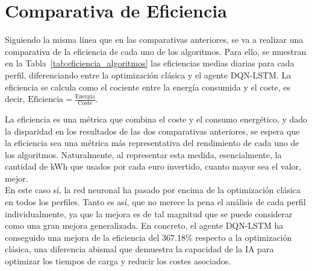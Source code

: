 \section{Comparativa de Eficiencia}
Siguiendo la misma línea que en las comparativas anteriores, se va a realizar una comparativa de la 
eficiencia de cada uno de los algoritmos. Para ello, se muestran en la Tabla~\ref{tab:eficiencia_algoritmos} 
las eficiencias medias diarias para cada perfil, diferenciando entre la optimización clásica y el 
agente DQN-LSTM. La eficiencia se calcula como el cociente entre la energía consumida y el coste, 
es decir, \( \text{Eficiencia} = \frac{\text{Energía}}{\text{Coste}} \).
\begin{table}[H]
    \centering
    \caption{Comparativa de la eficiencia diaria (kWh/EUR) por perfil entre la optimización clásica y el agente DQN-LSTM, junto con el porcentaje de mejora en eficiencia.}
    \label{tab:eficiencia_algoritmos}
\end{table}

La eficiencia es una métrica que combina el coste y el consumo energético, y dado la disparidad en 
los resultados de las dos comparativas anteriores, se espera que la eficiencia sea una métrica más
representativa del rendimiento de cada uno de los algoritmos. Naturalmente, al representar esta
medida, esencialmente, la cantidad de kWh que usados por cada euro invertido, cuanto mayor sea el
valor, mejor.\\

En este caso sí, la red neuronal ha pasado por encima de la optimización clásica en todos los perfiles.
Tanto es así, que no merece la pena el análisis de cada perfil individualmente, ya que la mejora es
de tal magnitud que se puede considerar como una gran mejora generalizada. En concreto, el agente 
DQN-LSTM ha conseguido una mejora de la eficiencia del 367.18\% respecto a la optimización clásica,
una diferencia abismal que demuestra la capacidad de la IA para optimizar los tiempos de carga y reducir
los costes asociados.\\

